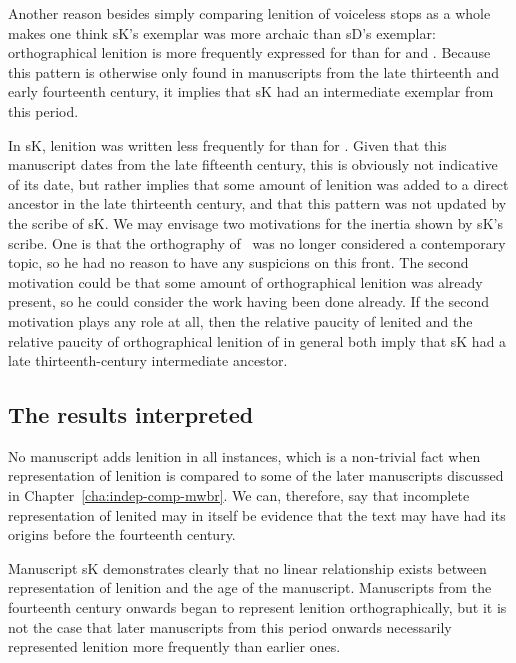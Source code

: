 Another reason besides simply comparing lenition of voiceless stops as a whole makes one think \gls{sK}'s exemplar was more archaic than \gls{sD}'s exemplar: orthographical lenition is more frequently expressed for  than for  and . Because this pattern is otherwise only found in manuscripts from the late thirteenth and early fourteenth century, it implies that \gls{sK} had an intermediate exemplar from this period.
  
In \gls{sK}, lenition was written less frequently for  than for . Given that this manuscript dates from the late fifteenth century, this is obviously not indicative of its date, but rather implies that some amount of lenition was added to a direct ancestor in the late thirteenth century, and that this pattern was not updated by the scribe of \gls{sK}. We may envisage two motivations for the inertia shown by \gls{sK}'s scribe. One is that the orthography of \lT\ was no longer considered a contemporary topic, so he had no reason to have any suspicions on this front. The second motivation could be that some amount of orthographical lenition was already present, so he could consider the work having been done already. If the second motivation plays any role at all, then the relative paucity of lenited  and the relative paucity of orthographical lenition of  in general both imply that \gls{sK} had a late thirteenth-century intermediate ancestor.

\subsection{The results interpreted}
\label{sec:interm-concl}

No manuscript adds lenition in all instances, which is a non-trivial fact when representation of lenition is compared to some of the later  manuscripts discussed in Chapter~\ref{cha:indep-comp-mwbr}. We can, therefore, say that incomplete representation of lenited  may in itself be evidence that the text may have had its origins before the fourteenth century.

Manuscript \gls{sK} demonstrates clearly that no linear relationship exists between representation of lenition and the age of the manuscript. Manuscripts from the fourteenth century onwards began to represent lenition orthographically, but it is not the case that later manuscripts from this period onwards necessarily represented lenition more frequently than earlier ones.
  
